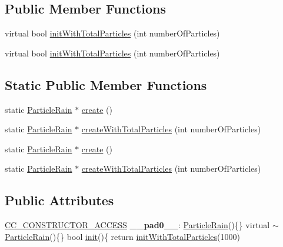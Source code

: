 \subsection*{Public Member Functions}
\begin{DoxyCompactItemize}
\item 
virtual bool \hyperlink{classParticleRain_a5fa80a9b8344c32f946f16a4626d6719}{init\+With\+Total\+Particles} (int number\+Of\+Particles)
\item 
virtual bool \hyperlink{classParticleRain_a895dfc2e55e4dc66b927ed78dbf8ba34}{init\+With\+Total\+Particles} (int number\+Of\+Particles)
\end{DoxyCompactItemize}
\subsection*{Static Public Member Functions}
\begin{DoxyCompactItemize}
\item 
static \hyperlink{classParticleRain}{Particle\+Rain} $\ast$ \hyperlink{classParticleRain_a75183441b5fad3654e7b9cdfe55295aa}{create} ()
\item 
static \hyperlink{classParticleRain}{Particle\+Rain} $\ast$ \hyperlink{classParticleRain_a514aadfca68cfc54cd534aa51ff6230d}{create\+With\+Total\+Particles} (int number\+Of\+Particles)
\item 
static \hyperlink{classParticleRain}{Particle\+Rain} $\ast$ \hyperlink{classParticleRain_a4692030065ad66d65d22da7b57f2cc23}{create} ()
\item 
static \hyperlink{classParticleRain}{Particle\+Rain} $\ast$ \hyperlink{classParticleRain_a910fb8fe21820cffa5197b90925d0f29}{create\+With\+Total\+Particles} (int number\+Of\+Particles)
\end{DoxyCompactItemize}
\subsection*{Public Attributes}
\begin{DoxyCompactItemize}
\item 
\mbox{\label{classParticleRain_a45ebd9c800ce4f8b180c673447f5820c}} 
\hyperlink{_2cocos2d_2cocos_2base_2ccConfig_8h_a25ef1314f97c35a2ed3d029b0ead6da0}{C\+C\+\_\+\+C\+O\+N\+S\+T\+R\+U\+C\+T\+O\+R\+\_\+\+A\+C\+C\+E\+SS} {\bfseries \+\_\+\+\_\+pad0\+\_\+\+\_\+}\+: \hyperlink{classParticleRain}{Particle\+Rain}()\{\} virtual $\sim$\hyperlink{classParticleRain}{Particle\+Rain}()\{\} bool \hyperlink{classParticleSystem_a65c05b30432f6e8aeb45ba018f3a8d3f}{init}()\{ return \hyperlink{classParticleRain_a5fa80a9b8344c32f946f16a4626d6719}{init\+With\+Total\+Particles}(1000)
\end{DoxyCompactItemize}
